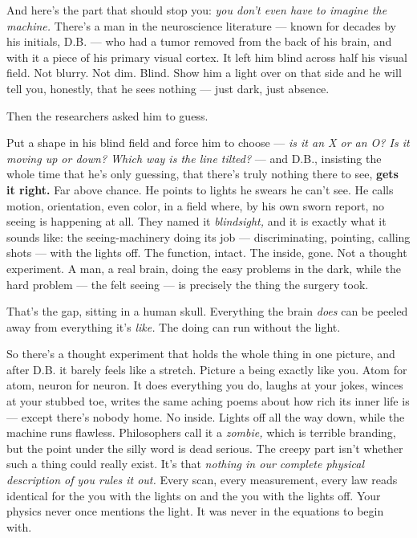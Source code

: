 \documentclass[11pt,openany]{book}
\begin{document}
And here’s the part that should stop you: \textit{you don’t even have to imagine the machine.} There’s a man in the neuroscience literature — known for decades by his initials, D.B. — who had a tumor removed from the back of his brain, and with it a piece of his primary visual cortex. It left him blind across half his visual field. Not blurry. Not dim. Blind. Show him a light over on that side and he will tell you, honestly, that he sees nothing — just dark, just absence.

Then the researchers asked him to guess.

Put a shape in his blind field and force him to choose — \textit{is it an X or an O? Is it moving up or down? Which way is the line tilted?} — and D.B., insisting the whole time that he’s only guessing, that there’s truly nothing there to see, \textbf{gets it right.} Far above chance. He points to lights he swears he can’t see. He calls motion, orientation, even color, in a field where, by his own sworn report, no seeing is happening at all. They named it \textit{blindsight,} and it is exactly what it sounds like: the seeing-machinery doing its job — discriminating, pointing, calling shots — with the lights off. The function, intact. The inside, gone. Not a thought experiment. A man, a real brain, doing the easy problems in the dark, while the hard problem — the felt seeing — is precisely the thing the surgery took.

That’s the gap, sitting in a human skull. Everything the brain \textit{does} can be peeled away from everything it’s \textit{like.} The doing can run without the light.

So there’s a thought experiment that holds the whole thing in one picture, and after D.B. it barely feels like a stretch. Picture a being exactly like you. Atom for atom, neuron for neuron. It does everything you do, laughs at your jokes, winces at your stubbed toe, writes the same aching poems about how rich its inner life is — except there’s nobody home. No inside. Lights off all the way down, while the machine runs flawless. Philosophers call it a \textit{zombie,} which is terrible branding, but the point under the silly word is dead serious. The creepy part isn’t whether such a thing could really exist. It’s that \textit{nothing in our complete physical description of you rules it out.} Every scan, every measurement, every law reads identical for the you with the lights on and the you with the lights off. Your physics never once mentions the light. It was never in the equations to begin with.
\end{document}
